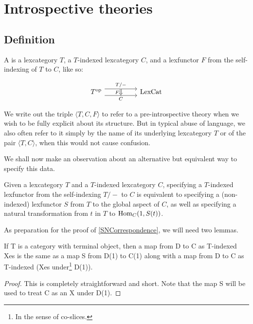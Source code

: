 \section{Introspective theories}

\subsection{Definition}
\begin{definition} \label{DefnPreIntrospIndexed}
A  is a lexcategory $T$, a $T$-indexed lexcategory $C$, and a lexfunctor $F$ from the self-indexing of $T$ to $C$, like so:

\[\begin{tikzcd}
	{\op{T}} && {\LexCat}
	\arrow["{T/-}"{name=0}, from=1-1, to=1-3, shift left=2]
	\arrow["{C}"{name=1, swap}, from=1-1, to=1-3, shift right=2]
	\arrow[Rightarrow, "{F}"', from=0, to=1]
\end{tikzcd}\]
\end{definition}

We write out the triple $\langle T, C, F \rangle$ to refer to a pre-introspective theory when we wish to be fully explicit about its structure. But in typical abuse of language, we also often refer to it simply by the name of its underlying lexcategory $T$ or of the pair $\langle T, C \rangle$, when this would not cause confusion.

We shall now make an observation about an alternative but equivalent way to specify this data.

\begin{theorem}\label{SNCorrespondence}
Given a lexcategory $T$ and a $T$-indexed lexcategory $C$, specifying a $T$-indexed lexfunctor from the self-indexing $T/-$ to $C$ is equivalent to specifying a (non-indexed) lexfunctor $S$ from $T$ to the global aspect of $C$, as well as specifying a natural transformation from $t$ in $T$ to $\operatorname{Hom}_C(1, S(t))$.
\end{theorem}

As preparation for the proof of \cref{SNCorrespondence}, we will need two lemmas.

\begin{lemma}\label{Lemma1}
If T is a category with terminal object, then a map from D to C as T-indexed Xes is the same as a map S from D(1) to C(1) along with a map from D to C as T-indexed (Xes under\footnote{In the sense of co-slices.} D(1)).
\end{lemma}
\begin{proof}
This is completely straightforward and short. Note that the map S will be used to treat C as an X under D(1). \TODO
\end{proof}

